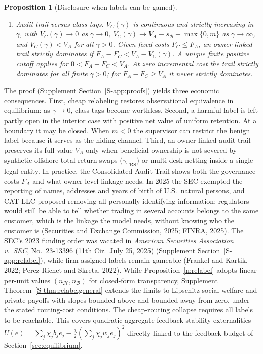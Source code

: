 \documentclass[11pt,letterpaper]{article}
\newtheorem{proposition}[theorem]{Proposition}
\theoremstyle{definition}
\begin{document}
\begin{proposition}[Disclosure when labels can be gamed]
\begin{enumerate}
\begin{itemize}
  \end{itemize}
  In every case, the equilibrium hiding share lies strictly in $(0, 1)$, and at interior optima it is independent of $\gamma$: $z^* = \alpha_{\mathcal{H}}/(2\alpha_{\mathcal{H}} + b_{\mathcal{H}})$ when $m \ge 0$ and $z^* = s_{\mathcal{B}}/\{\chi(2\alpha_{\mathcal{H}} + b_{\mathcal{H}})\}$ when $m < 0$.
  \item[(iii)] \emph{Audit trail versus class tags.} $V_C(\gamma)$ is continuous and strictly increasing in $\gamma$, with $V_C(\gamma) \to 0$ as $\gamma \to 0$, $V_C(\gamma) \to V_A \equiv s_{\mathcal{B}} - \max\{0, m\}$ as $\gamma \to \infty$, and $V_C(\gamma) < V_A$ for all $\gamma > 0$. Given fixed costs $F_C\le F_A$, an owner-linked trail strictly dominates if $F_A-F_C<V_A-V_C(\gamma)$. A unique finite positive cutoff applies for $0<F_A-F_C<V_A$. At zero incremental cost the trail strictly dominates for all finite $\gamma>0$; for $F_A-F_C\ge V_A$ it never strictly dominates.
\end{enumerate}
\end{proposition}

The proof (Supplement Section~\ref{S-app:proofs}) yields three economic consequences. First, cheap relabeling restores observational equivalence in equilibrium: as $\gamma \to 0$, class tags become worthless. Second, a harmful label is left partly open in the interior case with positive net value of uniform retention. At a boundary it may be closed. When $m<0$ the supervisor can restrict the benign label because it serves as the hiding channel. Third, an owner-linked audit trail preserves its full value $V_A$ only when beneficial ownership is not severed by synthetic offshore total-return swaps ($\gamma_{\mathrm{TRS}}$) or multi-desk netting inside a single legal entity. In practice, the Consolidated Audit Trail shows both the governance costs $F_A$ and what owner-level linkage needs. In 2025 the SEC exempted the reporting of names, addresses and years of birth of U.S.\ natural persons, and CAT LLC proposed removing all personally identifying information; regulators would still be able to tell whether trading in several accounts belongs to the same customer, which is the linkage the model needs, without knowing who the customer is (Securities and Exchange Commission, 2025; FINRA, 2025). The SEC's 2023 funding order was vacated in \emph{American Securities Association v.\ SEC}, No.~23-13396 (11th Cir.\ July 25, 2025) (Supplement Section~\ref{S-app:relabel}), while firm-assigned labels remain gameable (Frankel and Kartik, 2022; Perez-Richet and Skreta, 2022). While Proposition~\ref{n:relabel} adopts linear per-unit values $(n_{\mathcal{H}}, n_{\mathcal{B}})$ for closed-form transparency, Supplement Theorem~\ref{S-thm:relabelgeneral} extends the limits to Lipschitz social welfare and private payoffs with slopes bounded above and bounded away from zero, under the stated routing-cost conditions. The cheap-routing collapse requires all labels to be reachable. This covers quadratic aggregate-feedback stability externalities $U(e) = \sum_j \chi_j b_j e_j - \frac{\lambda}{2}(\sum_j \chi_j w_j e_j)^2$ directly linked to the feedback budget of Section~\ref{sec:equilibrium}.
\end{document}

